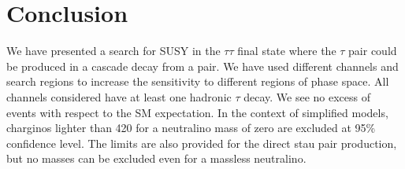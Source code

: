 \section{Conclusion}
\label{sect:conclusion}
We have presented a search for SUSY in the $\tau\tau$ final state where the
$\tau$ pair could be produced in a cascade decay from a \PSGcpDo pair.
We have used different channels and search regions to increase the sensitivity to
different regions of phase space. 
All channels considered have at least one hadronic $\tau$ decay.
We see no excess of events with respect to the SM expectation.
In the context of simplified models, charginos lighter than 420\GeV 
for a neutralino mass of zero are excluded at 95\% confidence level.
The limits are also provided for the direct stau pair production, but no masses  can be excluded 
even for a massless neutralino.

